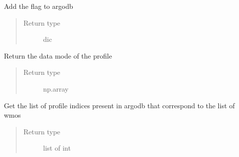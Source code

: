 \documentclass[letterpaper,10pt,english]{sphinxmanual}
\begin{document}

\begin{fulllineitems}
\label{\detokenize{pargopy:pargopy.argotools.flag_argodb}}
Add the flag to argodb
\begin{quote}\begin{description}
\item[{Return type}] \leavevmode
dic

\end{description}\end{quote}

\end{fulllineitems}


\begin{fulllineitems}
\label{\detokenize{pargopy:pargopy.argotools.get_datamode}}
Return the data mode of the profile
\begin{quote}\begin{description}
\item[{Return type}] \leavevmode
np.array

\end{description}\end{quote}

\end{fulllineitems}


\begin{fulllineitems}
\label{\detokenize{pargopy:pargopy.argotools.get_idx_from_list_wmo}}
Get the list of profile indices present in argodb that correspond
to the list of wmos
\begin{quote}\begin{description}
\item[{Return type}] \leavevmode
list of int

\end{description}\end{quote}

\end{fulllineitems}
\end{document}
